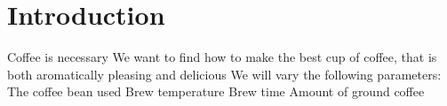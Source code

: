 \section{Introduction}
\cite{Navarini2009}

\begin{outline}[enumerate]
\1 Coffee is necessary
\1 We want to find how to make the best cup of coffee, that is both aromatically pleasing and delicious
\1 We will vary the following parameters:
	\2 The coffee bean used
	\2 Brew temperature
	\2 Brew time
	\2 Amount of ground coffee
\end{outline}